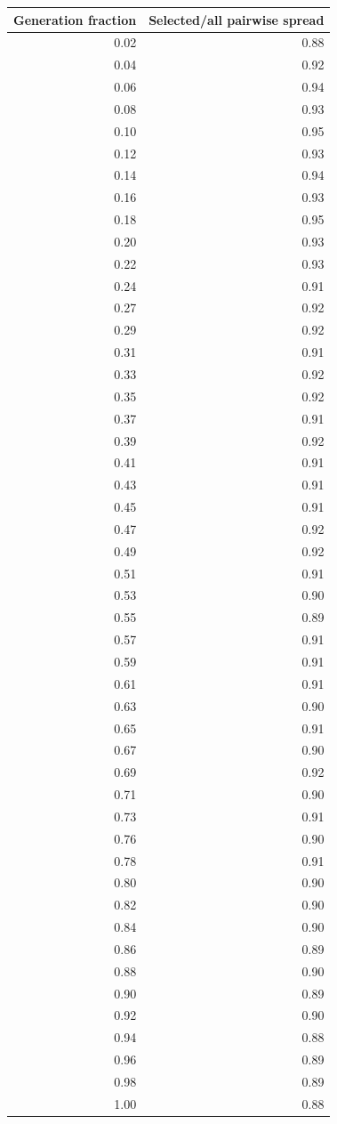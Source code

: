 \begin{tabular}{rr}
\toprule
Generation fraction & Selected/all pairwise spread \\
\midrule
0.02 & 0.88 \\
0.04 & 0.92 \\
0.06 & 0.94 \\
0.08 & 0.93 \\
0.10 & 0.95 \\
0.12 & 0.93 \\
0.14 & 0.94 \\
0.16 & 0.93 \\
0.18 & 0.95 \\
0.20 & 0.93 \\
0.22 & 0.93 \\
0.24 & 0.91 \\
0.27 & 0.92 \\
0.29 & 0.92 \\
0.31 & 0.91 \\
0.33 & 0.92 \\
0.35 & 0.92 \\
0.37 & 0.91 \\
0.39 & 0.92 \\
0.41 & 0.91 \\
0.43 & 0.91 \\
0.45 & 0.91 \\
0.47 & 0.92 \\
0.49 & 0.92 \\
0.51 & 0.91 \\
0.53 & 0.90 \\
0.55 & 0.89 \\
0.57 & 0.91 \\
0.59 & 0.91 \\
0.61 & 0.91 \\
0.63 & 0.90 \\
0.65 & 0.91 \\
0.67 & 0.90 \\
0.69 & 0.92 \\
0.71 & 0.90 \\
0.73 & 0.91 \\
0.76 & 0.90 \\
0.78 & 0.91 \\
0.80 & 0.90 \\
0.82 & 0.90 \\
0.84 & 0.90 \\
0.86 & 0.89 \\
0.88 & 0.90 \\
0.90 & 0.89 \\
0.92 & 0.90 \\
0.94 & 0.88 \\
0.96 & 0.89 \\
0.98 & 0.89 \\
1.00 & 0.88 \\
\bottomrule
\end{tabular}
